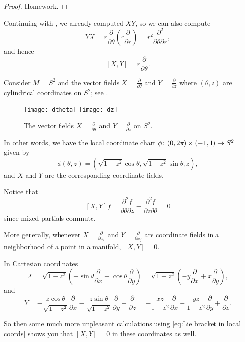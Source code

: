 \begin{proof}
	Homework.
\end{proof}

\begin{example}
	Continuing with , we already computed $XY$, so we can also compute 
	\[
		YX = r \frac{\partial}{\partial \theta} \left( r \frac{\partial}{\partial r}\right) = r^2 \frac{\partial^2}{\partial \theta \partial r},
	\]
	and hence
	\[
		[X,Y] = r \frac{\partial}{\partial \theta}.
	\]
\end{example}

\begin{example}
	Consider $M = S^2$ and the vector fields $X = \frac{\partial}{\partial \theta}$ and $Y = \frac{\partial}{\partial z}$ where $(\theta,z)$ are cylindrical coordinates on $S^2$; see . 
	
	\begin{figure}[htbp]
		\centering
			\texttt{[image: dtheta]} \qquad \texttt{[image: dz]}
		\caption{The vector fields $X = \frac{\partial}{\partial \theta}$ and $Y = \frac{\partial}{\partial z}$ on $S^2$.}
		\label{fig:dtheta and dz}
	\end{figure}
	
	In other words, we have the local coordinate chart $\phi\colon\thinspace\! (0,2\pi) \times (-1,1) \to S^2$ given by
	\[
		\phi(\theta,z) = (\sqrt{1-z^2} \cos\theta, \sqrt{1-z^2} \sin \theta, z),
	\]
	and $X$ and $Y$ are the corresponding coordinate fields.
	
	Notice that
	\[
		[X,Y]f = \frac{\partial^2 f}{\partial \theta \partial z} - \frac{\partial^2 f}{\partial z \partial \theta} = 0
	\]
	since mixed partials commute.
	
	More generally, whenever $X = \frac{\partial}{\partial x_i}$ and $Y = \frac{\partial}{\partial x_j}$ are coordinate fields in a neighborhood of a point in a manifold, $[X,Y] = 0$.
	
	In Cartesian coordinates
	\[
		X = \sqrt{1-z^2}\left( - \sin \theta \frac{\partial}{\partial x} + \cos \theta \frac{\partial}{\partial y}\right) = \sqrt{1-z^2}\left( - y \frac{\partial}{\partial x} + x \frac{\partial}{\partial y}\right),
	\]
	and
	\[
		Y = -\frac{z \cos\theta}{\sqrt{1-z^2}}\frac{\partial}{\partial x} - \frac{z \sin\theta}{\sqrt{1-z^2}}\frac{\partial}{\partial y} + \frac{\partial}{\partial z} = -\frac{xz}{1-z^2}\frac{\partial}{\partial x} - \frac{yz}{1-z^2}\frac{\partial}{\partial y} + \frac{\partial}{\partial z}.
	\]
	
	So then some much more unpleasant calculations using \eqref{eq:Lie bracket in local coords} shows you that $[X,Y] = 0$ in these coordinates as well.
\end{example}

